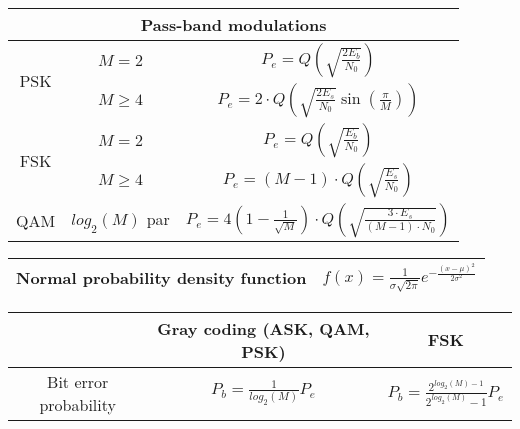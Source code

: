 \documentclass[12pt,es,blanco]{uah}
\begin{document}
\begin{center}
    \renewcommand{\arraystretch}{2.2}
        \begin{tabular}{|c|c|c|}
            \multicolumn{3}{c}{{\bf Pass-band modulations}}\\
            \hline
            \multirow{2}{*}{PSK} & $M=2$ & $P_e = Q\left ( \sqrt{\displaystyle\frac{2 E_b}{N_0}} \right)$ \\
            \cline{2-3}
            & $M \geq 4$ & $P_e = 2 \cdot Q\left ( \sqrt{\displaystyle\frac{2 E_s}{N_0}} \sin\left ( \displaystyle\frac{\pi}{M} \right)  \right)$ \\
            \hline
            \multirow{2}{*}{FSK} & $M=2$ & $P_e = Q\left ( \sqrt{\displaystyle\frac{E_b}{N_0}} \right)$ \\
            \cline{2-3}
            & $M\geq 4$ & $P_e = (M-1) \cdot Q\left ( \sqrt{\displaystyle\frac{E_s}{N_0}} \right)$ \\
            \hline
            QAM & $log_2(M)$ par & $P_e = 4 \left ( 1 - \displaystyle\frac{1}{\sqrt{M}} \right ) \cdot Q\left ( \sqrt{\displaystyle\frac{3 \cdot E_s}{(M-1) \cdot N_0}} \right)$ \\
            \hline
        \end{tabular}
        \renewcommand{\arraystretch}{1}
        \vspace{0.5cm}

    \renewcommand{\arraystretch}{2}
        \begin{tabular}{|c|c|}
            \hline 
            Normal probability density function & $f(x) = \displaystyle\frac{1}{\sigma \sqrt{2 \pi}} e^{- \displaystyle\frac{(x - \mu)^2}{2 \sigma^2}}$ \\
            \hline
        \end{tabular}
    \renewcommand{\arraystretch}{1}
    \vspace{0.5cm}
    
        \renewcommand{\arraystretch}{1.5}
        \begin{tabular}{|c|c|c|}
            \hline
            & Gray coding (ASK, QAM, PSK) & FSK \\ 
            \hline
            Bit error probability & $P_b = \displaystyle\frac{1}{log_2(M)} P_e$ & $P_b = \displaystyle\frac{2^{log_2(M)-1}}{2^{log_2(M)}-1} P_e$ \\
            \hline
        \end{tabular}
        \renewcommand{\arraystretch}{1} 
        \vspace{0.5cm}
    

\end{center}
\end{document}
